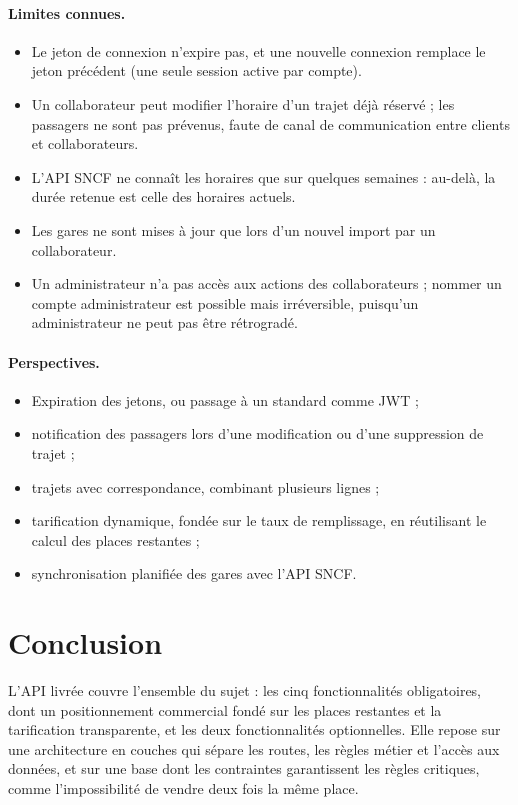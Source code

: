 \documentclass[11pt,a4paper]{article}
\begin{document}
\paragraph{Limites connues.}
\begin{itemize}[nosep]
  \item Le jeton de connexion n'expire pas, et une nouvelle connexion remplace le jeton précédent
        (une seule session active par compte).
  \item Un collaborateur peut modifier l'horaire d'un trajet déjà réservé ; les passagers ne sont
        pas prévenus, faute de canal de communication entre clients et collaborateurs.
  \item L'API SNCF ne connaît les horaires que sur quelques semaines : au-delà, la durée retenue est
        celle des horaires actuels.
  \item Les gares ne sont mises à jour que lors d'un nouvel import par un collaborateur.
  \item Un administrateur n'a pas accès aux actions des collaborateurs ; nommer un compte
        administrateur est possible mais irréversible, puisqu'un administrateur ne peut pas être
        rétrogradé.
\end{itemize}

\paragraph{Perspectives.}
\begin{itemize}[nosep]
  \item Expiration des jetons, ou passage à un standard comme JWT ;
  \item notification des passagers lors d'une modification ou d'une suppression de trajet ;
  \item trajets avec correspondance, combinant plusieurs lignes ;
  \item tarification dynamique, fondée sur le taux de remplissage, en réutilisant le calcul des
        places restantes ;
  \item synchronisation planifiée des gares avec l'API SNCF.
\end{itemize}

\section{Conclusion}

L'API livrée couvre l'ensemble du sujet : les cinq fonctionnalités obligatoires, dont un
positionnement commercial fondé sur les places restantes et la tarification transparente, et les
deux fonctionnalités optionnelles. Elle repose sur une architecture en couches qui sépare les routes,
les règles métier et l'accès aux données, et sur une base dont les contraintes garantissent les
règles critiques, comme l'impossibilité de vendre deux fois la même place.
\end{document}
